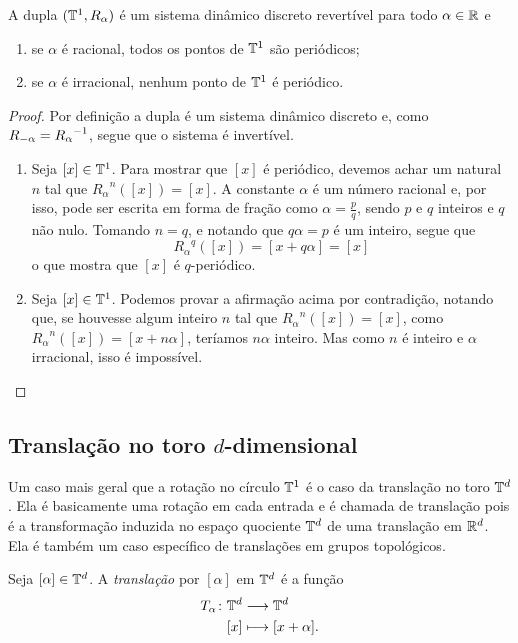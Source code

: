 \begin{proposition}
A dupla $(\mathbb{T}^1,R_\alpha)$ é um sistema dinâmico discreto revertível para todo $\alpha \in \mathbb{R}$ e
	\begin{enumerate}
	\item se $\alpha$ é racional, todos os pontos de $\mathbb{T}^1$ são periódicos;
	\item se $\alpha$ é irracional, nenhum ponto de $\mathbb{T}^1$ é periódico.
	\end{enumerate}
\end{proposition}
\begin{proof}
Por definição a dupla é um sistema dinâmico discreto e, como $R_{-\alpha}={R_\alpha}^{-1}$, segue que o sistema é invertível.
	\begin{enumerate}
	\item Seja $[x] \in \mathbb{T}^1$. Para mostrar que $[x]$ é periódico, devemos achar um natural $n$ tal que ${R_\alpha}^n([x]) = [x]$. A constante $\alpha$ é um número racional e, por isso, pode ser escrita em forma de fração como $\alpha = \frac{p}{q}$, sendo $p$ e $q$ inteiros e $q$ não nulo. Tomando $n = q$, e notando que $q\alpha=p$ é um inteiro, segue que
	\begin{equation*}
	{R_\alpha}^q([x]) = [x+q\alpha] = [x]
	\end{equation*}
o que mostra que $[x]$ é $q$-periódico.

	\item Seja $[x] \in \mathbb{T}^1$. Podemos provar a afirmação acima por contradição, notando que, se houvesse algum inteiro $n$ tal que ${R_\alpha}^n([x]) = [x]$, como ${R_\alpha}^n([x]) = [x + n\alpha]$, teríamos $n\alpha$ inteiro. Mas como $n$ é inteiro e $\alpha$ irracional, isso é impossível.
	\qedhere
	\end{enumerate}
\end{proof}

\subsection{Translação no toro $d$-dimensional}

Um caso mais geral que a rotação no círculo $\mathbb{T}^1$ é o caso da translação no toro $\mathbb{T}^d$. Ela é basicamente uma rotação em cada entrada e é chamada de translação pois é a transformação induzida no espaço quociente $\mathbb{T}^d$ de uma translação em $\mathbb{R}^d$. Ela é também um caso específico de translações em grupos topológicos.

\begin{definition}
Seja $[\alpha] \in \mathbb{T}^d$. A \emph{translação} por $[\alpha]$ em $\mathbb{T}^d$ é a função
	\begin{align*}
	{T_\alpha}\colon {\mathbb{T}^d} &\longrightarrow {\mathbb{T}^d} \\{[x]} &\longmapsto [x+\alpha].
	\end{align*}
\end{definition}

